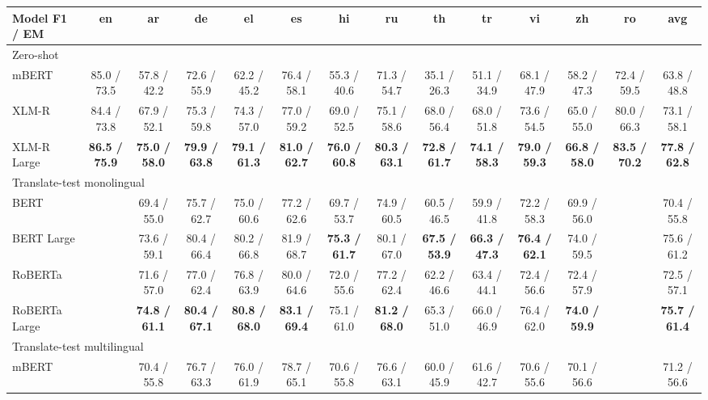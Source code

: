 \documentclass[11pt]{article}
\begin{document}
\begin{table*}[!ht]
    \centering
    \begin{adjustbox}{max width=\textwidth}
    \begin{tabular}{l|cccccccccccc|c}
        \toprule
        Model F1 / EM & en & ar & de & el & es & hi & ru & th & tr & vi & zh & ro & avg \\
        \midrule
        \multicolumn{14}{l}{Zero-shot} \\
        \midrule
        mBERT & 85.0 / 73.5 & 57.8 / 42.2 & 72.6 / 55.9 & 62.2 / 45.2 & 76.4 / 58.1 & 55.3 / 40.6 & 71.3 / 54.7 & 35.1 / 26.3 & 51.1 / 34.9 & 68.1 / 47.9 & 58.2 / 47.3 & 72.4 / 59.5 & 63.8 / 48.8 \\
        XLM-R & 84.4 / 73.8 & 67.9 / 52.1 & 75.3 / 59.8 & 74.3 / 57.0 & 77.0 / 59.2 & 69.0 / 52.5 & 75.1 / 58.6 & 68.0 / 56.4 & 68.0 / 51.8 & 73.6 / 54.5 & 65.0 / 55.0 & 80.0 / 66.3 & 73.1 / 58.1 \\
        XLM-R Large &\textbf{86.5 / 75.9}&\textbf{75.0 / 58.0}&\textbf{79.9 / 63.8}&\textbf{79.1 / 61.3}&\textbf{81.0 / 62.7}&\textbf{76.0 / 60.8}&\textbf{80.3 / 63.1}&\textbf{72.8 / 61.7}&\textbf{74.1 / 58.3}&\textbf{79.0 / 59.3}&\textbf{66.8 / 58.0}&\textbf{83.5 / 70.2}&\textbf{77.8 / 62.8}\\
        \midrule
        \multicolumn{14}{l}{Translate-test monolingual} \\
        \midrule
        BERT & ~ & 69.4 / 55.0 & 75.7 / 62.7 & 75.0 / 60.6 & 77.2 / 62.6 & 69.7 / 53.7 & 74.9 / 60.5 & 60.5 / 46.5 & 59.9 / 41.8 & 72.2 / 58.3 & 69.9 / 56.0 & ~ & 70.4 / 55.8 \\
        BERT Large & ~ & 73.6 / 59.1 & 80.4 / 66.4 & 80.2 / 66.8 & 81.9 / 68.7 &\textbf{75.3 / 61.7}& 80.1 / 67.0 &\textbf{67.5 / 53.9}&\textbf{66.3 / 47.3}&\textbf{76.4 / 62.1}& 74.0 / 59.5 & ~ & 75.6 / 61.2 \\
        RoBERTa & ~ & 71.6 / 57.0 & 77.0 / 62.4 & 76.8 / 63.9 & 80.0 / 64.6 & 72.0 / 55.6 & 77.2 / 62.4 & 62.2 / 46.6 & 63.4 / 44.1 & 72.4 / 56.6 & 72.4 / 57.9 & ~ & 72.5 / 57.1 \\
        RoBERTa Large & ~ &\textbf{74.8 / 61.1}&\textbf{80.4 / 67.1}&\textbf{80.8 / 68.0}&\textbf{83.1 / 69.4}& 75.1 / 61.0 &\textbf{81.2 / 68.0}& 65.3 / 51.0 & 66.0 / 46.9 & 76.4 / 62.0 &\textbf{74.0 / 59.9}& ~ &\textbf{75.7 / 61.4}\\
        \midrule
        \multicolumn{14}{l}{Translate-test multilingual} \\
        \midrule
        mBERT & ~ & 70.4 / 55.8 & 76.7 / 63.3 & 76.0 / 61.9 & 78.7 / 65.1 & 70.6 / 55.8 & 76.6 / 63.1 & 60.0 / 45.9 & 61.6 / 42.7 & 70.6 / 55.6 & 70.1 / 56.6 & ~ & 71.2 / 56.6 \\

\end{tabular}
\end{adjustbox}
\end{table*}
\end{document}
